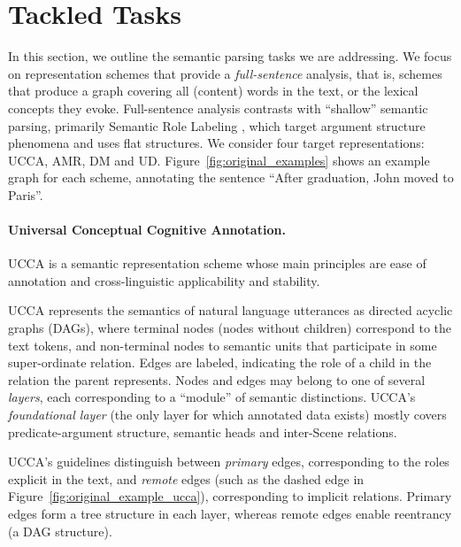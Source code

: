 \documentclass[11pt,a4paper]{article}
\begin{document}
\section{Tackled Tasks}\label{sec:tasks}

In this section, we outline the semantic parsing tasks we are addressing.
We focus on representation schemes that provide a \textit{full-sentence} analysis,
that is, schemes that produce a graph covering all (content) words in the text, or the
lexical concepts they evoke.
Full-sentence analysis contrasts with ``shallow'' semantic parsing,
primarily Semantic Role Labeling
\cite[SRL;][]{Palmer:05,gildea2002automatic,swayamdipta2017frame,ringgaard2017sling},
which target argument structure phenomena and uses flat structures.
We consider four target representations: UCCA, AMR, DM and UD.
Figure~\ref{fig:original_examples} shows an example graph for each scheme,
annotating the sentence ``After graduation, John moved to Paris''.

\paragraph{Universal Conceptual Cognitive Annotation.}\label{sec:ucca}
UCCA \cite{abend2013universal} is a semantic representation scheme whose main principles
are ease of annotation and cross-linguistic applicability and stability.

UCCA represents the semantics of natural language utterances
as directed acyclic graphs (DAGs), where terminal nodes (nodes without children)
correspond to the text tokens, and non-terminal nodes to semantic units that participate
in some super-ordinate relation.
Edges are labeled, indicating the role of a child in the relation the parent represents.
Nodes and edges may belong to one of several \textit{layers}, each corresponding
to a ``module'' of semantic distinctions.
UCCA's \textit{foundational layer} (the only layer for which annotated data exists) 
mostly covers predicate-argument structure, semantic heads and inter-Scene relations.

UCCA's guidelines distinguish between \textit{primary} edges, corresponding 
to the roles explicit in the text, and \textit{remote} edges (such as the dashed edge in
Figure~\ref{fig:original_example_ucca}), corresponding to implicit relations.
Primary edges form a tree structure in each layer,
whereas remote edges enable reentrancy (a DAG structure).
\end{document}
